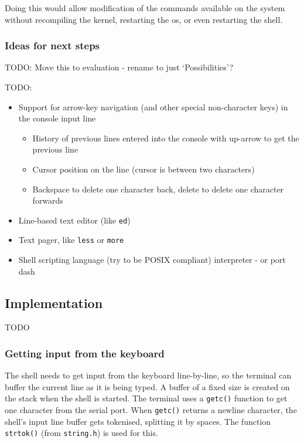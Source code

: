 \documentclass{article}
\begin{document}
Doing this would allow modification of the commands available on the system
without recompiling the kernel, restarting the \gls{os}, or even restarting the
shell.

\subsubsection{Ideas for next steps}
TODO: Move this to evaluation - rename to just `Possibilities'?

TODO:
\begin{itemize}
    \item Support for arrow-key navigation (and other special non-character
        keys) in the console input line
        \begin{itemize}
            \item History of previous lines entered into the console with
                up-arrow to get the previous line
            \item Cursor position on the line (cursor is between two
                characters)
            \item Backspace to delete one character back, delete to delete one
                character forwards
        \end{itemize}
    \item Line-based text editor (like \texttt{ed})
    \item Text pager, like \texttt{less} or \texttt{more}
    \item Shell scripting language (try to be POSIX compliant) interpreter - or
        port dash~\cite{dash-shell}
\end{itemize}


\subsection{Implementation}
TODO

\subsubsection{Getting input from the keyboard}
The shell needs to get input from the keyboard line-by-line, so the terminal
can buffer the current line as it is being typed. A buffer of a fixed size is
created on the stack when the shell is started. The terminal uses a
\texttt{getc()} function to get one character from the serial port. When
\texttt{getc()} returns a newline character, the shell's input line buffer gets
tokenised, splitting it by spaces. The function \texttt{strtok()} (from
\texttt{string.h}) is used for this.
\end{document}
